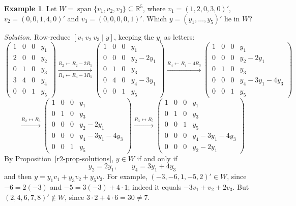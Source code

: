 \documentclass[12pt]{article}
\newcommand{\R}{\mathbb R}
\DeclareMathOperator{\Span}{span}
\theoremstyle{definition}
\newtheorem{example}[theorem]{Example}
\begin{document}
\begin{example}\label{r3-exm-span}
Let \(W=\Span\{v_1,v_2,v_3\}\subseteq\R^5\), where \(v_1=(1,2,0,3,0)'\),
\(v_2=(0,0,1,4,0)'\) and \(v_3=(0,0,0,0,1)'\). Which \(y=(y_1,\dots,y_5)'\) lie in \(W\)?

\textit{Solution.} Row-reduce \([v_1\ v_2\ v_3\mid y]\), keeping the \(y_i\) as letters:
\[
\left(\begin{array}{ccc|c}1&0&0&y_1\\2&0&0&y_2\\0&1&0&y_3\\3&4&0&y_4\\0&0&1&y_5\end{array}\right)
\xrightarrow[R_4\leftarrow R_4-3R_1]{R_2\leftarrow R_2-2R_1}
\left(\begin{array}{ccc|c}1&0&0&y_1\\0&0&0&y_2-2y_1\\0&1&0&y_3\\0&4&0&y_4-3y_1\\0&0&1&y_5\end{array}\right)
\xrightarrow{R_4\leftarrow R_4-4R_3}
\left(\begin{array}{ccc|c}1&0&0&y_1\\0&0&0&y_2-2y_1\\0&1&0&y_3\\0&0&0&y_4-3y_1-4y_3\\0&0&1&y_5\end{array}\right)
\]
\[
\xrightarrow{R_2\leftrightarrow R_3}
\left(\begin{array}{ccc|c}1&0&0&y_1\\0&1&0&y_3\\0&0&0&y_2-2y_1\\0&0&0&y_4-3y_1-4y_3\\0&0&1&y_5\end{array}\right)
\xrightarrow{R_3\leftrightarrow R_5}
\left(\begin{array}{ccc|c}1&0&0&y_1\\0&1&0&y_3\\0&0&1&y_5\\0&0&0&y_4-3y_1-4y_3\\0&0&0&y_2-2y_1\end{array}\right)
\]
By Proposition~\ref{r2-prop-solutions}, \(y\in W\) if and only if
\[
y_2=2y_1,\qquad y_4=3y_1+4y_3
\]
and then \(y=y_1v_1+y_3v_2+y_5v_3\). For example, \((-3,-6,1,-5,2)'\in W\), since
\(-6=2(-3)\) and \(-5=3(-3)+4\cdot1\); indeed it equals \(-3v_1+v_2+2v_3\). But
\((2,4,6,7,8)'\notin W\), since \(3\cdot2+4\cdot6=30\ne7\).
\end{example}
\end{document}
